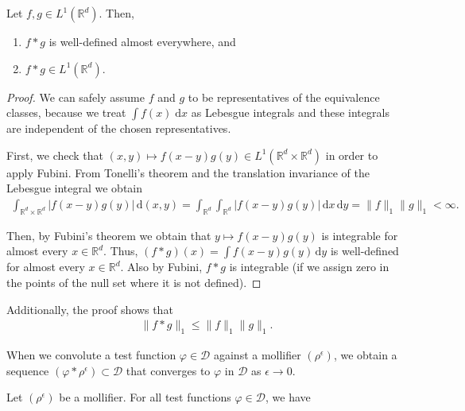 \begin{lemma}
    Let \(f,g \in {L}^1(\mathbb{R}^d)\). Then, 
    \begin{enumerate}
        \item \(f*g\) is well-defined almost everywhere, and 
        \item \(f*g \in {L}^1(\mathbb{R}^d)\).
    \end{enumerate}
\end{lemma}
\begin{proof}
    We can safely assume \(f\) and \(g\) to be representatives of the equivalence classes, because we  treat \(\int f(x) \; \mathrm{d}x\) as Lebesgue integrals and these integrals are independent of the chosen representatives.

    First, we check that \((x,y) \mapsto f(x-y)g(y) \in L^1(\mathbb{R}^d \times \mathbb{R}^d)\) in order to apply Fubini. From Tonelli's theorem and the translation invariance of the Lebesgue integral we obtain
    \begin{align*}
        \int_{\mathbb{R}^d \times \mathbb{R}^d}|f(x-y)g(y)| \, \mathrm{d}(x,y) = \int_{\mathbb{R}^d}\int_{\mathbb{R}^d} |f(x-y)g(y)| \, \mathrm{d}x \, \mathrm{d}y = \lVert f \rVert_{1} \lVert g \rVert_{1} < \infty.
    \end{align*}

    Then, by Fubini's theorem we obtain that \(y \mapsto f(x-y)g(y)\) is integrable for almost every \(x \in \mathbb{R}^d\). Thus, \((f*g)(x) = \int f(x-y)g(y) \, \mathrm{d}y\) is well-defined for almost every \(x \in \mathbb{R}^d\). Also by Fubini, \(f*g\) is integrable (if we assign zero in the points of the null set where it is not defined).
\end{proof}
Additionally, the proof shows that
\begin{align}\label{inequality:l1-norm}
    \lVert f*g \rVert_1 \leq \lVert f \rVert_{1} \lVert g \rVert_{1}.
\end{align}

When we convolute a test function \(\varphi \in \mathcal{D}\) against a mollifier \((\rho^\epsilon)\), we obtain a sequence \((\varphi * \rho^\epsilon) \subset \mathcal{D}\) that converges to \({\varphi}\) in \(\mathcal{D}\) as \(\epsilon \to 0\).  

\begin{lemma}\label{mollifier-lemma}
    Let \((\rho^\epsilon)\) be a mollifier. For all test functions \(\varphi \in \mathcal{D}\), we have
\end{lemma}

